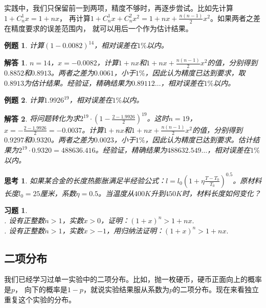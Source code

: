 \documentclass[12pt,UTF8]{ctexbook}
\newtheorem{et}{例题}[section]
\newtheorem{sk}{思考}[section]
\newtheorem*{so}{解答}
\newtheorem{xt}{习题}[section]
\begin{document}
实践中，我们只保留前一到两项，精度不够时，再逐步尝试。比如先计算$1 + C_n^1x = 1 + nx$，
再计算$1 + C_n^1x + C_n^2x^2 = 1 + nx + \frac{n(n-1)}{2}x^2$。如果两者之差在精度要求的误差范围内，
就可以用后一个作为估计结果。
\begin{et}
    计算$(1 - 0.0082)^{14}$，相对误差在$1\%$以内。
\end{et}
\begin{so}
    $n=14$，$x=-0.0082$，计算$1 + nx$和$1 + nx + \frac{n(n-1)}{2}x^2$的值，分别得到$0.8852$和$0.8913$。两者之差为$0.0061$，小于$1\%$，因此认为精度已达到要求，取$0.8913$为估计结果。经验证，精确结果为$0.89112\dots$，相对误差在$1\%$以内。
\end{so}
\begin{et}
    计算$1.9926^{19}$，相对误差在$1\%$以内。
\end{et}
\begin{so}
    将问题转化为求$2^{19}\cdot(1-\frac{2-1.9926}{2})^{19}$。这时$n=19$，$x = -\frac{2-1.9926}{2} = -0.0037$。计算$1 + nx$和$1 + nx + \frac{n(n-1)}{2}x^2$的值，分别得到$0.9297$和$0.9320$。两者之差为$0.0023$，小于$1\%$，因此认为精度已达到要求。估计结果为$2^{19}\cdot 0.9320=488636.416$。经验证，精确结果为$488632.549\dots$，相对误差在$1\%$以内。
\end{so}

\begin{sk}
    如果某合金的长度热膨胀满足半经验公式：$l = l_0(1+\eta\frac{T-T_0}{T_0})^{0.5}$。原材料长度$l_0=25$厘米，系数$\eta=0.5$。当温度从$400K$升到$450K$时，材料长度如何变化？
\end{sk}

\begin{xt}
    \mbox{} \\
    . 设有正整数$n > 1$，实数$x > 0$，证明：$(1 + x)^n > 1 + nx.$\\
    . 设有正整数$n > 1$，实数$x > -1$，用归纳法证明：$(1 + x)^n > 1 + nx.$
\end{xt}

\subsection{二项分布}

我们已经学习过单一实验中的二项分布。比如，抛一枚硬币，硬币正面向上的概率是$p$，
向下的概率是$1-p$，就说实验结果服从系数为$p$的二项分布。现在来看独立重复这个实验的分布。
\end{document}
